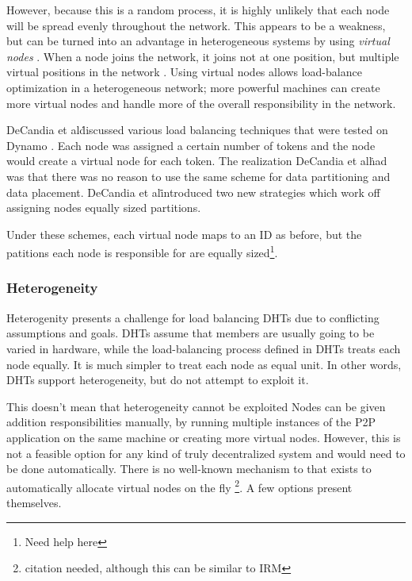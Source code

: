\documentclass[10pt,letterpaper,twoside]{report}
\begin{document}
However, because this is a random process, it is highly unlikely that each node will be spread evenly throughout the network.
This appears to be a weakness, but can be turned into an advantage in heterogeneous systems by using \textit{virtual nodes} \cite{godfrey2005heterogeneity} \cite{dynamo}.
When a node joins the network, it joins not at one position, but multiple virtual positions in the network \cite{dynamo}.
Using virtual nodes allows load-balance optimization in a heterogeneous network; more powerful machines can create more virtual nodes and handle more of the overall responsibility in the network.

DeCandia et al\. discussed various load balancing techniques that were tested on Dynamo \cite{dynamo}.  
Each node was assigned a certain number of tokens and the node would create a virtual node for each token.
The realization DeCandia et al\. had was that there was no reason to use the same scheme for data partitioning and data placement.
DeCandia et al\. introduced two new strategies which work off assigning nodes equally sized partitions.


Under these schemes, each virtual node maps to an ID as before, but the patitions each node is responsible for are equally sized\footnote{Need help here}.

\subsubsection{Heterogeneity}
\label{subsec:hetero}
Heterogenity presents a challenge for load balancing DHTs due to conflicting assumptions and goals. 
DHTs assume that members are usually going to be varied in hardware, while the load-balancing process defined in DHTs treats each node equally.
It is much simpler to treat each node as equal unit.
In other words, DHTs support heterogeneity, but do not attempt to exploit it.

This doesn't mean that heterogeneity cannot be exploited
Nodes can be given addition responsibilities manually, by running multiple instances of the P2P application on the same machine or creating more virtual nodes.
However, this is not a feasible option for any kind of truly decentralized system and would need to be done automatically.
There is no well-known mechanism to that exists to automatically  allocate virtual nodes on the fly \footnote{citation needed, although this can be similar to IRM}. 
A few options present themselves.  %
\end{document}
